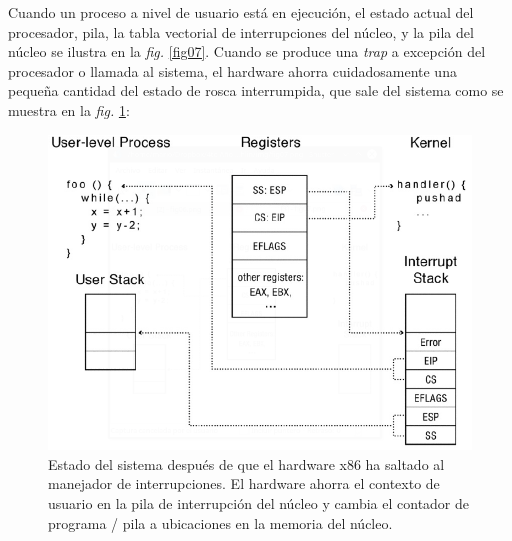 \documentclass[10pt]{book}
\begin{document}
Cuando un proceso a nivel de usuario está en ejecución, el estado actual del procesador, pila, la tabla vectorial de interrupciones del núcleo, y la pila del núcleo se ilustra en la \textit{fig.} \ref{fig07}. Cuando se produce una \textit{trap} a excepción del procesador o llamada al sistema, el hardware ahorra cuidadosamente una pequeña cantidad del estado de rosca interrumpida, que sale del sistema como se muestra en la \textit{fig.} \ref{fig08}:

\begin{figure}[tbhp]
\centerline{\includegraphics[scale=0.55]{img/fig08}}
\caption{Estado del sistema después de que el hardware x$86$ ha saltado al manejador de interrupciones. El hardware ahorra el contexto de usuario en la pila de interrupción del núcleo y cambia el contador de programa / pila a ubicaciones en la memoria del núcleo.}
\label{fig08}
\end{figure}
\end{document}
